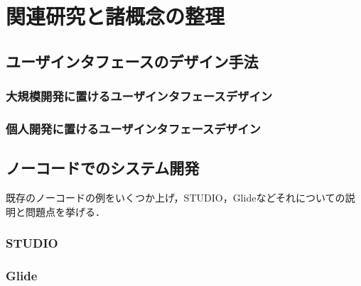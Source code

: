 \chapter{関連研究と諸概念の整理}
\label{chap:prevresearch}

\section{ユーザインタフェースのデザイン手法}


\subsection{大規模開発に置けるユーザインタフェースデザイン}
\subsection{個人開発に置けるユーザインタフェースデザイン}

\section{ノーコードでのシステム開発}
既存のノーコードの例をいくつか上げ，STUDIO，Glideなどそれについての説明と問題点を挙げる．

\subsection{STUDIO}

\subsection{Glide}

